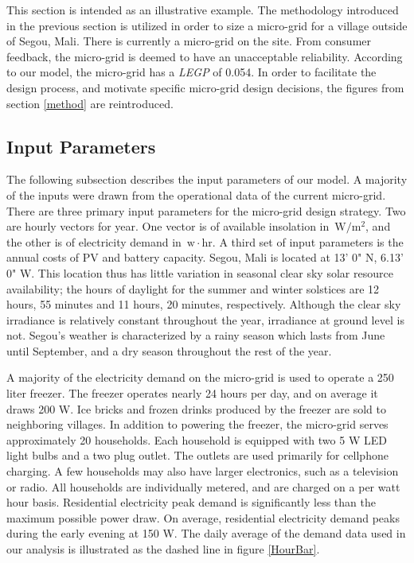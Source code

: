 \documentclass[11p]{article}
\newcommand{\unit}[1]{\ensuremath{\, \mathrm{#1}}}
\begin{document}

This section is intended as an illustrative example.
The methodology introduced in the previous section is utilized in order to size a micro-grid for a village outside of Segou, Mali.
There is currently a micro-grid on the site. 
From consumer feedback, the micro-grid is deemed to have an unacceptable reliability.
According to our model, the micro-grid has a \emph{LEGP} of 0.054.
In order to facilitate the design process, and motivate specific micro-grid design decisions, the figures from section \ref{method} are reintroduced.

\subsection{Input Parameters}

The following subsection describes the input parameters of our model.
A majority of the inputs were drawn from the operational data of the current micro-grid. 
There are three primary input parameters for the micro-grid design strategy. 
Two are hourly vectors for year. One vector is of available insolation in \unit{W/m^2}, and the other is of electricity demand in \unit{w\! \cdot \! hr}.
A third set of input parameters is the annual costs of PV and battery capacity. 
%
%
Segou, Mali is located at 13' 0" N, 6.13' 0" W. 
This location thus has little variation in seasonal clear sky solar resource availability; the hours of daylight for the summer and winter solstices are 12 hours, 55 minutes and 11 hours, 20 minutes, respectively.  
Although the clear sky irradiance is relatively constant throughout the year, irradiance at ground level is not.
Segou's weather is characterized by a rainy season which lasts from June until September, and a dry season throughout the rest of the year. 

A majority of the electricity demand on the micro-grid is used to operate
a 250 liter freezer.
The freezer operates nearly 24 hours per day, and on average it draws 200 W. 
Ice bricks and frozen drinks produced by the freezer are sold to neighboring villages.
In addition to powering the freezer, the micro-grid serves approximately 20 households.
Each household is equipped with two 5 W LED light bulbs and a two plug outlet. 
The outlets are used primarily for cellphone charging.
A few households may also have larger electronics, such as a television or radio.
All households are individually metered, and are charged on a per watt hour basis.
Residential electricity peak demand is significantly less than the maximum possible power draw. 
On average, residential electricity demand peaks during the early evening at 150 W.
The daily average of the demand data used in our analysis is illustrated as the dashed line in figure \ref{HourBar}.
\end{document}
